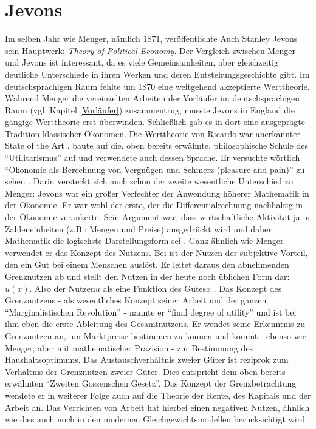 \section{Jevons}
\label{Jevons}

Im selben Jahr wie Menger, nämlich 1871, veröffentlichte Auch Stanley Jevons sein Hauptwerk: \textit{Theory of Political Economy}. Der Vergleich zwischen Menger und Jevons ist interessant, da es viele Gemeinsamkeiten, aber gleichzeitig deutliche Unterschiede in ihren Werken und deren Entstehungsgeschichte gibt. Im deutschsprachigen Raum fehlte um 1870 eine weitgehend akzeptierte Werttheorie. Während Menger die vereinzelten Arbeiten der Vorläufer im deutschsprachigen Raum (vgl. Kapitel \ref{Vorläufer}) zusammentrug, musste Jevons in England die gängige Werttheorie erst überwinden. Schließlich gab es in dort eine ausgeprägte Tradition klassischer Ökonomen. Die Werttheorie von Ricardo war anerkannter State of the Art \parencite[S. 320]{Rosner2012}. \textcite{Jevons1871} baute auf die, oben bereits erwähnte, philosophische Schule des "`Utilitarismus"' auf und verwendete auch dessen Sprache. Er versuchte wörtlich "`Ökonomie als Berechnung von Vergnügen und Schmerz (pleasure and pain)"' zu sehen \parencite[S. 321]{Rosner2012}. Darin versteckt sich auch schon der zweite wesentliche Unterschied zu Menger: Jevons war ein großer Verfechter der Anwendung höherer Mathematik in der Ökonomie. Er war wohl der erste, der die Differentialrechnung nachhaltig in der Ökonomie verankerte. Sein Argument war, dass wirtschaftliche Aktivität ja in Zahleneinheiten (z.B.: Mengen und Preise) ausgedrückt wird und daher Mathematik die logischste Darstellungsform sei \parencite[S. 71]{Jevons1871}. Ganz ähnlich wie Menger verwendet er das Konzept des Nutzens. Bei \textcite[S. 106]{Jevons1871} ist der Nutzen der subjektive Vorteil, den ein Gut bei einem Menschen auslöst. Er leitet daraus den abnehmenden Grenznutzen ab und stellt den Nutzen in der heute noch üblichen Form dar: $u(x)$. Also der Nutzen$u$ als eine Funktion des Gutes$x$ \parencite{Rosner2012}. Das Konzept des Grenznutzens - als wesentliches Konzept seiner Arbeit und der ganzen "`Marginalistischen Revolution"' - nannte er "`final degree of utility"' und ist bei ihm eben die erste Ableitung des Gesamtnutzens. Er wendet seine Erkenntnis zu Grenznutzen an, um Marktpreise bestimmen zu können und kommt - ebenso wie Menger, aber mit mathematischer Präzision - zur Bestimmung des Haushaltsoptimums. Das Austauschverhältnis zweier Güter ist reziprok zum Verhältnis der Grenznutzen zweier Güter. Dies entspricht dem oben bereits erwähnten "`Zweiten Gossenschen Gesetz"'. Das Konzept der Grenzbetrachtung wendete er in weiterer Folge auch auf die Theorie der Rente, des Kapitals und der Arbeit an. Das Verrichten von Arbeit hat hierbei einen negativen Nutzen, ähnlich wie dies auch noch in den modernen Gleichgewichtsmodellen berücksichtigt wird.

